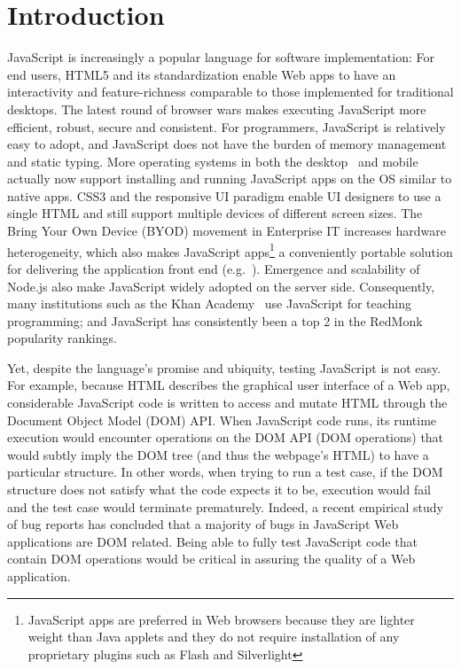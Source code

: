 \section{Introduction}
JavaScript is increasingly a popular language for software implementation: %
For end users, HTML5 and its standardization enable Web apps to have an interactivity and feature-richness comparable to those implemented for traditional desktops.  
The latest round of browser wars makes executing JavaScript more efficient, robust, secure and consistent.  
For programmers, JavaScript is relatively easy to adopt, and JavaScript does not have the burden of memory management and static typing.
More operating systems in both the desktop~\cite{chromeApps, windows8javascript} and mobile~\cite{apacheCordova, iosWebView, blackberryWebWorks, firefoxOS, androidWebView, tizen} actually now support installing and running JavaScript apps on the OS similar to native apps.
CSS3 and the responsive UI paradigm enable UI designers to use a single HTML and still support multiple devices of different screen sizes.  
The Bring Your Own Device (BYOD) movement in Enterprise IT increases hardware heterogeneity, 
which also makes JavaScript apps\footnote{JavaScript apps are preferred in Web browsers because they are lighter weight than Java applets and they do not require installation of any proprietary plugins such as Flash and Silverlight} 
a conveniently portable solution for delivering the application front end (e.g.~\cite{BNSFoffice365}).
Emergence and scalability of Node.js also make JavaScript widely adopted on the server side.  
Consequently, many institutions such as the Khan Academy~\cite{khanAcademy} use JavaScript for teaching programming; and JavaScript has consistently been a top 2 in the RedMonk~\cite{redmonk} popularity rankings.%

Yet, despite the language's promise and ubiquity, testing JavaScript is not easy.  
For example, because HTML describes the graphical user interface of a Web app, considerable JavaScript code is written to access and mutate HTML through the Document Object Model (DOM) API.  
When JavaScript code runs, its runtime execution would encounter operations on the DOM API (DOM operations) that would subtly imply the DOM tree (and thus the webpage's HTML) to have a particular structure.  
In other words, when trying to run a test case, if the DOM structure does not satisfy what the code expects it to be, execution would fail and the test case would terminate prematurely.  
Indeed, a recent empirical study~\cite{frolin2013} of bug reports has concluded that a majority of bugs in JavaScript Web applications are DOM related.  
Being able to fully test JavaScript code that contain DOM operations would be critical in assuring the quality of a Web application.  


